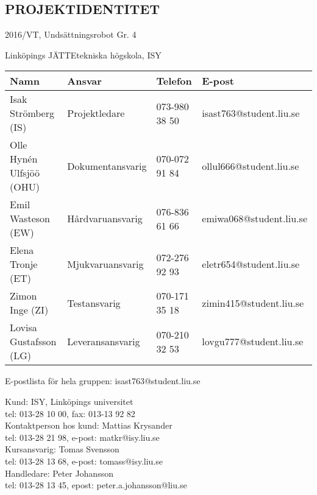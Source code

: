 \documentclass[11pt]{article}
\begin{document}
\pagebreak
\begin{center}

\section*{PROJEKTIDENTITET}
2016/VT, Undsättningsrobot Gr. 4

Linköpings JÄTTEtekniska högskola, ISY
\vspace{5em}
\begin{center}

\begin{tabular}{|l|l|l|l|} \hline
\textbf{Namn} & \textbf{Ansvar} & \textbf{Telefon} & \textbf{E-post}  \\ \hline 
Isak Strömberg (IS) & Projektledare & 073-980 38 50 & isast763@student.liu.se \\ \hline
Olle Hynén Ulfsjöö (OHU)& Dokumentansvarig & 070-072 91 84 & ollul666@student.liu.se \\ \hline
Emil Wasteson (EW) & Hårdvaruansvarig & 076-836 61 66 & emiwa068@student.liu.se \\ \hline
Elena Tronje (ET) & Mjukvaruansvarig & 072-276 92 93 & eletr654@student.liu.se \\ \hline
Zimon Inge (ZI)& Testansvarig & 070-171 35 18 & zimin415@student.liu.se \\ \hline
Lovisa Gustafsson (LG) & Leveransansvarig & 070-210 32 53 & lovgu777@student.liu.se \\ \hline
\end{tabular}

\end{center}

E-postlista för hela gruppen: isast763@student.liu.se

\vspace{5em}
Kund: ISY, Linköpings universitet \\
tel: 013-28 10 00, fax: 013-13 92 82 \\
Kontaktperson hos kund: Mattias Krysander \\
tel: 013-28 21 98, e-post: matkr@isy.liu.se \\

\vspace{5em}
Kursansvarig:  Tomas Svensson\\
tel: 013-28 13 68, e-post: tomass@isy.liu.se \\
Handledare: Peter Johansson \\
tel: 013-28 13 45, epost: peter.a.johansson@liu.se
\end{center}
\pagebreak
\end{document}
